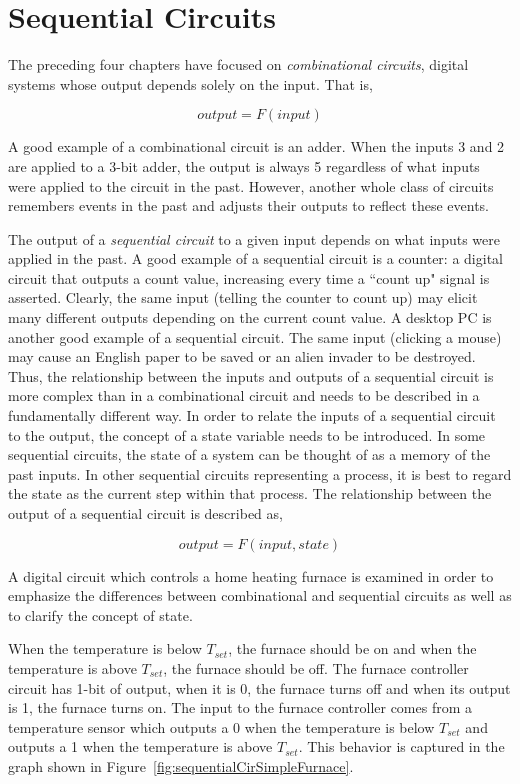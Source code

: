 \chapter{Sequential Circuits}
\label{chapter:Sequential Circuits}
\graphicspath{ {./chapter05/Fig} }

The preceding four chapters have focused on \textit{ combinational
circuits}, digital systems whose output depends solely on
the input.  That is,

$$output = F(input)$$

A good example of a combinational circuit is an adder.  When
the inputs 3 and 2 are applied to a 3-bit adder, the output
is always 5 regardless of what inputs were applied to the
circuit in the past. However, another whole class of
circuits remembers events in the past and adjusts
their outputs to reflect these events.

The output of a \textit{ sequential circuit} to a given input
depends on what inputs were applied in the past.  A good
example of a sequential circuit is a counter: a
digital circuit that outputs a count value, increasing
every time a ``count up" signal is asserted.  Clearly, the
same input (telling the counter to count up) may elicit
many different outputs depending on the current count
value.  A desktop PC is another good example of a
sequential circuit.  The same input (clicking a mouse) may cause an
English paper to be saved or an alien invader to be destroyed.  Thus, the
relationship between the inputs and outputs of a sequential circuit
is more complex than in a combinational circuit and needs
to be described in a fundamentally different way. In order to relate
the inputs of a sequential circuit to the output, the concept of a
state variable needs to be introduced.  In some sequential circuits, the
state of a system can be thought of as a memory of the past inputs.
In other sequential circuits
representing a process, it is best to regard the state as the current
step within that process.  The relationship between the output of
a sequential circuit is described as,

$$output = F(input, state)$$

A digital circuit which  controls a home heating furnace is examined
in order  to emphasize the differences between combinational and
sequential circuits as well as to clarify the concept of state.

When the temperature is below $T_{set}$, the furnace should be on
and when the temperature is above $T_{set}$, the furnace should be
off.  The furnace controller circuit has 1-bit of output, when
it is 0, the furnace turns off and when its output is 1, the furnace turns on.
The input to the furnace controller comes
from a temperature sensor which outputs a 0 when the temperature
is below $T_{set}$ and outputs a 1 when the temperature
is above $T_{set}$.  This behavior is captured in the graph shown
in Figure~\ref{fig:sequentialCirSimpleFurnace}.

